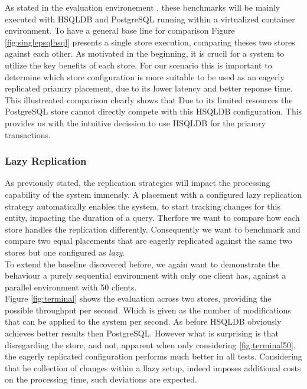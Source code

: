 As stated in the evaluation environement , these benchmarks will be mainly executed with HSQLDB and PostgreSQL running within a virtualized 
container environment. To have a general base line for comparison Figure \ref{fig:singlepsqlhsql} presents a single store execution, comparing theses two stores against each other.
As motivated in the beginning, it is crucil for a system to utilize the key benefits of each store. For our scenario this is important to determine which 
store configuration is more suitable to be used as an eagerly replicated priamry placement, due to its lower latency and better reponse time.\\
This illustreated comparison clearly shows that Due to its limited resources the PostgreSQL store cannot directly compete with this HSQLDB configuration.
This provides us with the intuitive decission to use HSQLDB for the priamry transactions.








\subsubsection{Lazy Replication} 

As previously stated, the replication strategies will impact the processing capability of the system immensly.
A placement with a configured lazy replication strategy automatically enables the system, to start tracking changes for this entity, impacting the duration of a query.
Therfore we want to compare how each store handles the replication differently. Consequently we want to benchmark and compare two equal placements that are eagerly replicated
against the same two stores but one configured as \emph{lazy}.\\

To extend the baseline discovered before, we again want to demonstrate the behaviour a purely sequential environment with only one client has, 
against a parallel environment with 50 clients.\\
Figure \ref{fig:terminal} shows the evaluation across two stores, providing the possible throughput per second. Which is given as the number of modifications that can be 
applied to the system per second. As before HSQLDB obviously achieves better results then PostgreSQL. However what is surprising is that disregarding the store,
and not, apparent when only considering  \ref{fig:terminal50}, the eagerly replicated configuration performs much better in all tests.
Considering that he collection of changes within a llazy setup, indeed imposes additional costs on the processing time, such deviations are expected.

